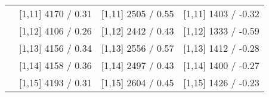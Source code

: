\begin{table}
\begin{tabular}[t]{llll}
 & {}[1,11] 4170  / 0.31 & {}[1,11] 2505  / 0.55 & {}[1,11] 1403  / -0.32\\
 & {}[1,12] 4106  / 0.26 & {}[1,12] 2442  / 0.43 & {}[1,12] 1333  / -0.59\\
\addlinespace
 & {}[1,13] 4156  / 0.34 & {}[1,13] 2556  / 0.57 & {}[1,13] 1412  / -0.28\\
 & {}[1,14] 4158  / 0.36 & {}[1,14] 2497  / 0.43 & {}[1,14] 1400  / -0.27\\
 & {}[1,15] 4193  / 0.31 & {}[1,15] 2604  / 0.45 & {}[1,15] 1426  / -0.23\\
\bottomrule
\end{tabular}
\end{table}
